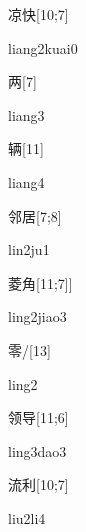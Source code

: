 \begin{verbete}{凉快}[10;7]
\begin{pronuncia}{liang2kuai0}
\end{pronuncia}
\end{verbete}

\begin{verbete}[liang3]{两}[7]
\begin{pronuncia}{liang3}
\end{pronuncia}
\end{verbete}

\begin{verbete}[liang4]{辆}[11]
\begin{pronuncia}{liang4}
\end{pronuncia}
\end{verbete}

\begin{verbete}[lin2ju1]{邻居}[7;8]
\begin{pronuncia}{lin2ju1}
\end{pronuncia}
\end{verbete}

\begin{verbete}{菱角}[11;7]]
\begin{pronuncia}{ling2jiao3}
\end{pronuncia}
\end{verbete}

\begin{verbete}[ling2]{零/\Circle}[13]
\begin{pronuncia}{ling2}
\end{pronuncia}
\end{verbete}

\begin{verbete}{领导}[11;6]
\begin{pronuncia}{ling3dao3}
\end{pronuncia}
\end{verbete}

\begin{verbete}[liu2li4]{流利}[10;7]
\begin{pronuncia}{liu2li4}
\end{pronuncia}
\end{verbete}

